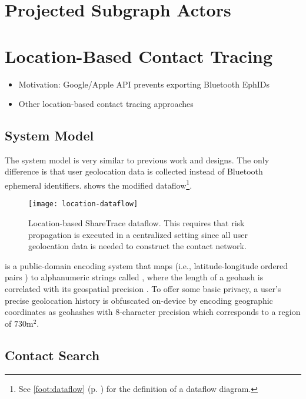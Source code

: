 \section{Projected Subgraph Actors}\label{sec:projected-subgraphs}

\section{Location-Based Contact Tracing}\label{sec:location-based}
	\begin{itemize}
	\item Motivation: Google/Apple API prevents exporting Bluetooth EphIDs
	\item Other location-based contact tracing approaches
	\end{itemize}
\subsection{System Model}
The system model is very similar to previous work \cite{Ayday2020, Ayday2021} and designs. The only difference is that user geolocation data is collected instead of Bluetooth ephemeral identifiers.  shows the modified dataflow\footnote{See \cref{foot:dataflow} (p. ) for the definition of a dataflow diagram.}.
	\begin{figure}[ht!]
		\texttt{[image: location-dataflow]}
		\caption[Geolocation-based ShareTrace dataflow]{Location-based ShareTrace dataflow. This requires that risk propagation is executed in a centralized setting since all user geolocation data is needed to construct the contact network.}
		\label{fig:location-based}
	\end{figure}
 is a public-domain encoding system that maps  (i.e., latitude-longitude ordered pairs \cite[p. 5]{Sickle2004}) to alphanumeric strings called , where the length of a geohash is correlated with its geospatial precision \cite{Morton1966}. To offer some basic privacy, a user's precise geolocation history is obfuscated on-device by encoding geographic coordinates as geohashes with 8-character precision which corresponds to a region of $730\mathrm{m}^2$.

\subsection{Contact Search}

\newcommand{\histories}{\mathcal{H}}
\newcommand{\locations}{\mathbb{L}}
\newcommand{\locset}{\mathcal{L}}
\newcommand{\latitude}{\phi}
\newcommand{\longitude}{\lambda}
\newcommand{\users}{\mathcal{U}}
\newcommand{\sindex}{\mathcal{I}}
\newcommand{\query}{\mathcal{N}}
\newcommand{\qelement}{q}
\newcommand{\hone}{G}
\newcommand{\htwo}{H}
\newcommand{\neighbors}{N}

